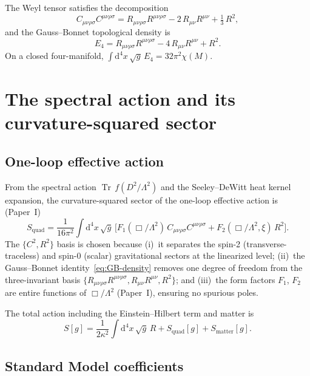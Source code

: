 \documentclass[12pt,a4paper]{article}
\newcommand{\Weylsq}{C_{\mu\nu\rho\sigma}C^{\mu\nu\rho\sigma}}
\newcommand{\Ricsq}{R_{\mu\nu}R^{\mu\nu}}
\newcommand{\Riemsq}{R_{\mu\nu\rho\sigma}R^{\mu\nu\rho\sigma}}
\newcommand{\dd}{\mathrm{d}}
\newcommand{\Tr}{\operatorname{Tr}}
\newcommand{\Lam}{\Lambda}
\theoremstyle{plain}
\theoremstyle{definition}
\begin{document}
\noindent
The Weyl tensor satisfies the decomposition
\begin{equation}\label{eq:weyl-decomp}
  \Weylsq = \Riemsq - 2\,\Ricsq + \tfrac{1}{3}\,R^2,
\end{equation}
and the Gauss--Bonnet topological density is
\begin{equation}\label{eq:GB-density}
  E_4 = \Riemsq - 4\,\Ricsq + R^2.
\end{equation}
On a closed four-manifold,
$\int \dd^4x\,\sqrt{g}\,E_4 = 32\pi^2\chi(M)$.

\section{The spectral action and its curvature-squared sector}
\label{sec:spectral-action}

\subsection{One-loop effective action}

From the spectral action $\Tr\,f(D^2/\Lam^2)$ and the Seeley--DeWitt heat
kernel expansion, the curvature-squared sector of the one-loop effective
action is (Paper~I)
\begin{equation}\label{eq:S-quad}
  S_{\mathrm{quad}} = \frac{1}{16\pi^2}\int\dd^4x\,\sqrt{g}\,
  \bigl[F_1(\Box/\Lam^2)\,\Weylsq
  + F_2(\Box/\Lam^2,\xi)\,R^2\bigr].
\end{equation}
The $\{C^2, R^2\}$ basis is chosen because (i)~it separates the spin-2
(transverse-traceless) and spin-0 (scalar) gravitational sectors at the
linearized level; (ii)~the Gauss--Bonnet identity~\eqref{eq:GB-density}
removes one degree of freedom from the three-invariant basis
$\{\Riemsq, \Ricsq, R^2\}$; and (iii)~the form factors $F_1$, $F_2$ are
entire functions of $\Box/\Lam^2$ (Paper~I), ensuring no spurious poles.

The total action including the Einstein--Hilbert term and matter is
\begin{equation}\label{eq:S-total}
  S[g] = \frac{1}{2\kappa^2}\int\dd^4x\,\sqrt{g}\,R
  + S_{\mathrm{quad}}[g] + S_{\mathrm{matter}}[g].
\end{equation}

\subsection{Standard Model coefficients}
\end{document}
